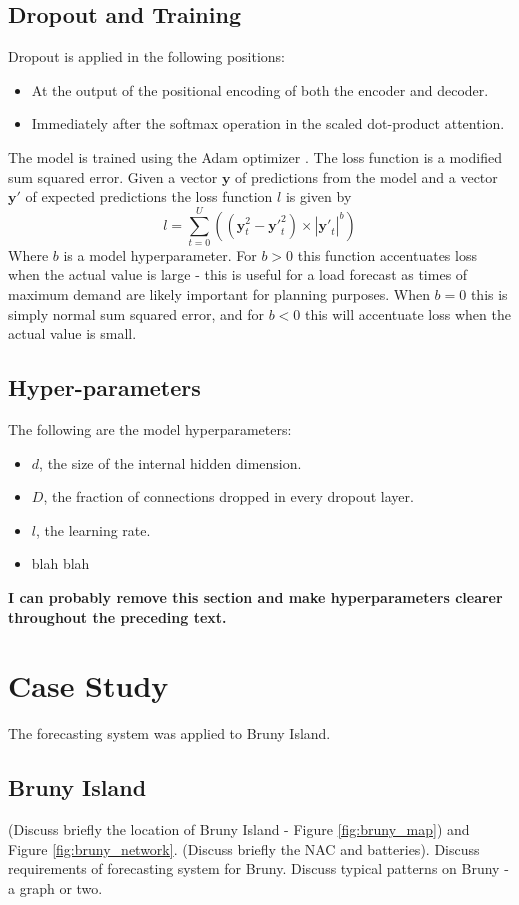 \documentclass[conference]{IEEEtran}
\begin{document}
\subsection{Dropout and Training}
Dropout is applied in the following positions:
\begin{itemize}
	\item At the output of the positional encoding of both the encoder and decoder.
	\item Immediately after the softmax operation in the scaled dot-product attention.
\end{itemize}
The model is trained using the Adam optimizer \cite{Kingma2014}.
The loss function is a modified sum squared error.
Given a vector $\boldsymbol{y}$ of predictions from the model and a vector $\boldsymbol{y'}$ of expected predictions the loss function $l$ is given by 
\begin{equation}
l = \sum_{t=0}^{U}((\boldsymbol{y}_t^2 - \boldsymbol{y'}_t^2) \times |\boldsymbol{y'}_t|^b)
\end{equation}
Where $b$ is a model hyperparameter.
For $b>0$ this function accentuates loss when the actual value is large - this is useful for a load forecast as times of maximum demand are likely important for planning purposes.
When $b=0$ this is simply normal sum squared error, and for $b<0$ this will accentuate loss when the actual value is small.

\subsection{Hyper-parameters}
The following are the model hyperparameters:
\begin{itemize}
	\item $d$, the size of the internal hidden dimension.
	\item $D$, the fraction of connections dropped in every dropout layer.
	\item $l$, the learning rate.
	\item blah blah 
\end{itemize}
\textbf{I can probably remove this section and make hyperparameters clearer throughout the preceding text.}


\section{Case Study}
The forecasting system was applied to Bruny Island.

\subsection{Bruny Island}
(Discuss briefly the location of Bruny Island - Figure \ref{fig:bruny_map}) and Figure \ref{fig:bruny_network}.
(Discuss briefly the NAC and batteries).
Discuss requirements of forecasting system for Bruny.
Discuss typical patterns on Bruny - a graph or two.
\end{document}
